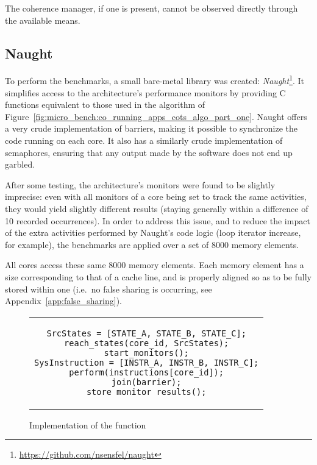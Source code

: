 \begin{limitation}
\label{lim:no_cmgr}
The coherence manager, if one is present, cannot be observed directly through
the available means.
\end{limitation}

\subsection{Naught}
To perform the benchmarks, a small bare-metal library was created:
\textit{Naught}\footnote{\url{https://github.com/nsensfel/naught}}. It
simplifies access to the architecture's performance monitors by providing C
functions equivalent to those used in the algorithm of
Figure~\ref{fig:micro_bench:co_running_apps_cots_algo_part_one}.  Naught offers
a very crude implementation of barriers, making it possible to synchronize the
code running on each core. It also has a similarly crude implementation of
semaphores, ensuring that any output made by the software does not end up
garbled.

After some testing, the architecture's monitors were found to be slightly
imprecise: even with all monitors of a core being set to track the same
activities,
they would yield slightly different results (staying generally within a
difference of 10 recorded occurrences). In order to address this issue, and to
reduce the impact of the extra activities performed by Naught's code logic
(loop iterator increase, for example), the benchmarks are applied over a set
of 8000 memory elements.

All cores access these same 8000 memory elements. Each memory element has a size
corresponding to that of a cache line, and is properly aligned so as to be fully
stored within one (i.e.~no false sharing is occurring, see
Appendix~\ref{app:false_sharing}).

\begin{figure}[hbt!]
\begin{center}
\begin{tabular}{c}
\begin{lstlisting}
SrcStates = [STATE_A, STATE_B, STATE_C];
reach_states(core_id, SrcStates);
start_monitors();
SysInstruction = [INSTR_A, INSTR_B, INSTR_C];
perform(instructions[core_id]);
join(barrier);
store_monitor_results();
\end{lstlisting}
\end{tabular}
\end{center}
\caption{Implementation of the \benchmark{} function}
\label{fig:identifying:benchmark_implementation}
\end{figure}


